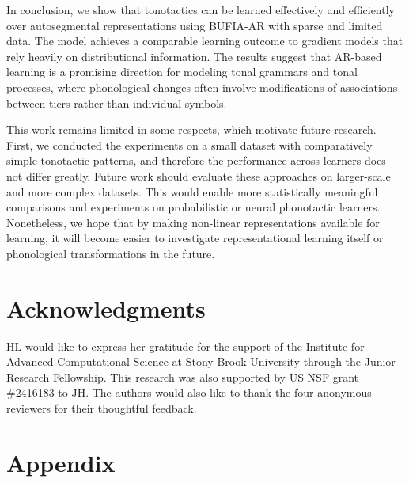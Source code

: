\documentclass[11pt]{article}
\begin{document}
In conclusion, we show that tonotactics can be learned
effectively and efficiently over autosegmental representations
using BUFIA-AR with sparse and limited data. The model
achieves a comparable learning outcome to gradient models
that rely heavily on distributional information.
The results suggest that AR-based learning is a promising
direction for modeling tonal grammars and tonal processes,
where phonological changes often involve modifications of
associations between tiers rather than individual symbols.

This work remains limited in some respects, which motivate 
future research. First, we conducted the experiments on a 
small dataset with comparatively simple tonotactic patterns, 
and therefore the performance across learners does not differ 
greatly. Future work should evaluate these approaches on 
larger-scale and more complex datasets. This would enable more 
statistically meaningful comparisons and experiments on probabilistic 
or neural phonotactic learners. Nonetheless, we hope that by 
making non-linear representations available for learning, 
it will become easier to investigate representational learning itself 
or phonological transformations in the future.

\section*{Acknowledgments}
HL would like to express her gratitude for the support of
the Institute for Advanced Computational Science at Stony Brook
University through the Junior Research Fellowship. This research was
also supported by US NSF grant \#2416183 to JH. The authors would also
like to thank the four anonymous reviewers for their thoughtful
feedback.




\vfill

\appendix
\section{Appendix}
\renewcommand{\thetable}{A\arabic{table}}
\setcounter{table}{0}


\end{document}
